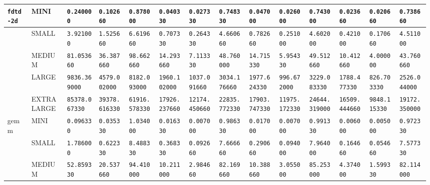 \begin{tabular}{l | l | l | l | l | l | l | l | l | l | l | l | l | l}
    \verb|fdtd-2d | & MINI       & \verb|0.240000     | & \verb|0.102660    | & \verb|0.878000    | & \verb|0.040330    | & \verb|0.027330    | & \verb|0.748330    | & \verb|0.047000    | & \verb|0.026000    | & \verb|0.743000    | & \verb|0.023660    | & \verb|0.020660    | & \verb|0.738660    | \\ \hline
             & SMALL      & \verb|3.921000     | & \verb|1.525660    | & \verb|6.619660    | & \verb|0.707330    | & \verb|0.264330    | & \verb|4.660660    | & \verb|0.782660    | & \verb|0.251000    | & \verb|4.602000    | & \verb|0.421000    | & \verb|0.170660    | & \verb|4.511000    | \\ \hline
             & MEDIUM     & \verb|81.053660    | & \verb|36.387660   | & \verb|98.662660   | & \verb|14.293660   | & \verb|7.113330    | & \verb|48.760000   | & \verb|14.715330   | & \verb|5.954330    | & \verb|49.512660   | & \verb|10.412660   | & \verb|4.000000    | & \verb|43.760660   | \\ \hline
             & LARGE      & \verb|9836.369000  | & \verb|4579.002000 | & \verb|8182.093000 | & \verb|1960.102000 | & \verb|1037.091660 | & \verb|3034.176660 | & \verb|1977.624330 | & \verb|996.672000  | & \verb|3229.083330 | & \verb|1788.477330 | & \verb|826.703330  | & \verb|2526.044000 | \\ \hline
             & EXTRALARGE & \verb|85378.067330 | & \verb|39378.616330| & \verb|61916.578330| & \verb|17926.237660| & \verb|12174.450660| & \verb|22835.772330| & \verb|17903.747330| & \verb|11975.172330| & \verb|24644.319000| & \verb|16509.444660| & \verb|9848.115330 | & \verb|19172.350000| \\ \hline
    gemm     & MINI       & \verb|0.096330     | & \verb|0.035330    | & \verb|1.034000    | & \verb|0.016330    | & \verb|0.007000    | & \verb|0.986330    | & \verb|0.017000    | & \verb|0.007000    | & \verb|0.991330    | & \verb|0.006000    | & \verb|0.005000    | & \verb|0.972330    | \\ \hline
             & SMALL      & \verb|1.786000     | & \verb|0.622330    | & \verb|8.488330    | & \verb|0.368330    | & \verb|0.092660    | & \verb|7.666660    | & \verb|0.290660    | & \verb|0.094000    | & \verb|7.964000    | & \verb|0.164660    | & \verb|0.054660    | & \verb|7.577330    | \\ \hline
             & MEDIUM     & \verb|52.859330    | & \verb|20.537660   | & \verb|94.410000   | & \verb|10.211000   | & \verb|2.984660    | & \verb|82.169660   | & \verb|10.388660   | & \verb|3.055000    | & \verb|85.253000   | & \verb|4.374000    | & \verb|1.599330    | & \verb|82.114000   | \\ \hline

\end{tabular}
